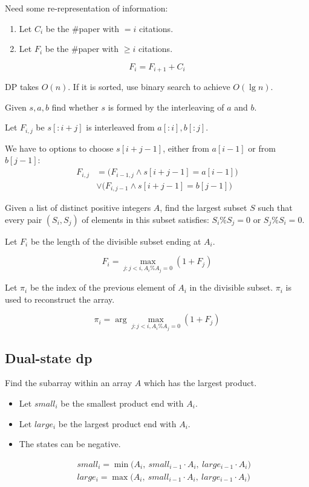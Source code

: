 {Need some re-representation of information: 
\begin{enumerate}
\item Let $C_i$ be the \#paper with $=i$ citations.
\item Let $F_i$ be the \#paper with $\geq i$ citations.
\end{enumerate}
$$
F_i = F_{i+1} + C_i
$$

DP takes $O(n)$. If it is sorted, use binary search to achieve $O(\lg n)$.

 Given $s, a, b$ find whether $s$ is formed by the interleaving
of $a$ and $b$.

Let $F_{i,j}$ be $s[:i+j]$ is interleaved from $a[:i], b[:j]$.

We have to options to choose $s[i+j-1]$, either from $a[i-1]$ or from $b[j-1]$:
\begin{align*}
F_{i,j} &= \Big(F_{i-1, j} \wedge s[i+j-1] = a[i-1]\Big) \\
& \vee \Big(F_{i,j-1} \wedge s[i+j-1] = b[j-1]\Big)
\end{align*}

 Given a list of distinct positive integers $A$, find the largest subset $S$ such that every pair $(S_i, S_j)$ of elements in this
subset satisfies: $S_i \% S_j = 0 \text{ or } S_j \% S_i = 0$.

Let $F_i$ be the length of the divisible subset ending at $A_i$. 

$$
F_i = \max_{j: j< i, A_i\%A_j=0}(1+F_j)
$$

Let $\pi_i$ be the index of the previous element of $A_i$ in the divisible subset. $\pi_i$ is used to reconstruct the array.

$$
\pi_i = \arg\max_{j: j< i, A_i\%A_j=0}(1+F_j)
$$

\subsection{Dual-state dp}
 Find the subarray within an array $A$ which has the largest product. 
\begin{itemize}
\item Let $small_i$ be the smallest product end with $A_i$. 
\item Let $large_i$ be the largest product end with $A_i$.
\item The states can be negative. 
\end{itemize}
\begin{eqnarray*}
&& small_i = \min\Big( A_i,\ small_{i-1}\cdot A_i,\ large_{i-1}\cdot A_i \Big)
\nonumber \\
&& large_i = \max\Big( A_i,\ small_{i-1}\cdot A_i,\ large_{i-1}\cdot A_i \Big)
\end{eqnarray*}

}
